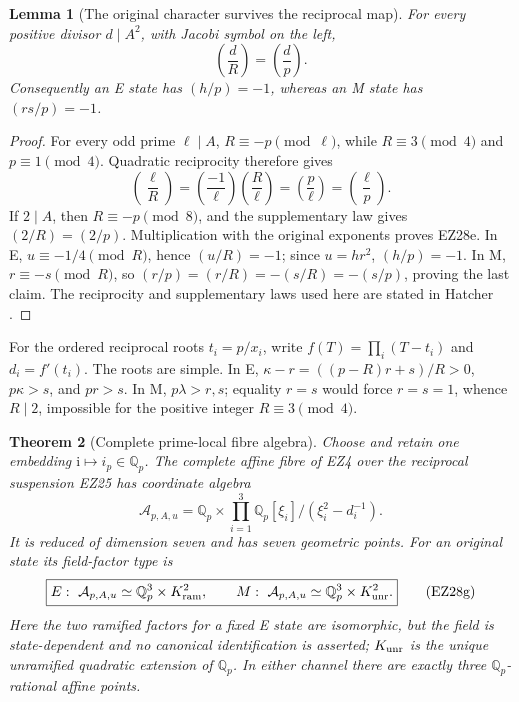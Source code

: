 \documentclass[11pt]{article}
\newtheorem{theorem}{Theorem}[section]
\newtheorem{lemma}[theorem]{Lemma}
\theoremstyle{definition}\newtheorem{definition}[theorem]{Definition}
\theoremstyle{remark}\newtheorem{remark}[theorem]{Remark}
\newcommand{\Q}{\mathbb Q}
\newcommand{\ii}{\mathrm i}
\begin{document}
\begin{lemma}[The original character survives the reciprocal map]
For every positive divisor \(d\mid A^2\), with Jacobi symbol on the left,
\begin{equation}
 \left(\frac dR\right)=\left(\frac dp\right).          \tag{EZ28e}
\end{equation}
Consequently an E state has \((h/p)=-1\), whereas an M state has
\((rs/p)=-1\).
\end{lemma}

\begin{proof}
For every odd prime \(\ell\mid A\), \(R\equiv-p\pmod\ell\), while
\(R\equiv3\pmod4\) and \(p\equiv1\pmod4\).  Quadratic reciprocity therefore
gives
\[
 \left(\frac\ell R\right)
 =\left(\frac{-1}\ell\right)\left(\frac R\ell\right)
 =\left(\frac p\ell\right)=\left(\frac\ell p\right).
\]
If \(2\mid A\), then \(R\equiv-p\pmod8\), and the supplementary law gives
\((2/R)=(2/p)\).  Multiplication with the original exponents proves EZ28e.
In E, \(u\equiv-1/4\pmod R\), hence \((u/R)=-1\); since \(u=hr^2\),
\((h/p)=-1\).  In M, \(r\equiv-s\pmod R\), so
\((r/p)=(r/R)=-(s/R)=-(s/p)\), proving the last claim.  The reciprocity and
supplementary laws used here are stated in Hatcher
\cite[Section 6.4]{Hatcher}.
\end{proof}

For the ordered reciprocal roots \(t_i=p/x_i\), write
\(f(T)=\prod_i(T-t_i)\) and \(d_i=f'(t_i)\).  The roots are simple.  In E,
\(\kappa-r=((p-R)r+s)/R>0\), \(p\kappa>s\), and \(pr>s\).  In M,
\(p\lambda>r,s\); equality \(r=s\) would force \(r=s=1\), whence
\(R\mid2\), impossible for the positive integer \(R\equiv3\pmod4\).

\begin{theorem}[Complete prime-local fibre algebra]\label{thm:local-fibre}
Choose and retain one embedding \(\ii\mapsto i_p\in\Q_p\).  The complete
affine fibre of EZ4 over the reciprocal suspension EZ25 has coordinate algebra
\begin{equation}
 \boxed{\mathcal A_{p,A,u}=
 \Q_p\times\prod_{i=1}^3
 \Q_p[\xi_i]/(\xi_i^2-d_i^{-1}).}                     \tag{EZ28f}
\end{equation}
It is reduced of dimension seven and has seven geometric points.  For an
original state its field-factor type is
\begin{equation}
 \boxed{
 E:\ \mathcal A_{p,A,u}\simeq\Q_p^3\times K_{\rm ram}^2,
 \qquad
 M:\ \mathcal A_{p,A,u}\simeq\Q_p^3\times K_{\rm unr}^2.} \tag{EZ28g}
\end{equation}
Here the two ramified factors for a fixed E state are isomorphic, but the
field is state-dependent and no canonical identification is asserted;
\(K_{\rm unr}\) is the unique unramified quadratic extension of \(\Q_p\).
In either channel there are exactly three \(\Q_p\)-rational affine points.
\end{theorem}
\end{document}
